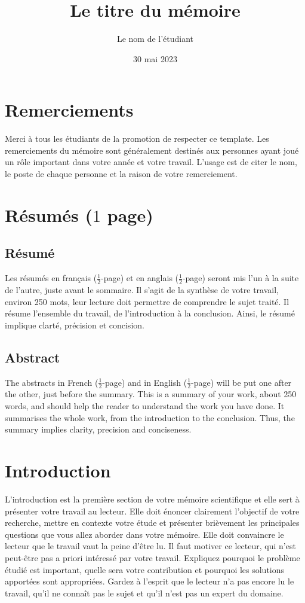 \documentclass[a4paper, 12pt, twoside]{report}
\author{Le nom de l'étudiant}
\title{Le titre du mémoire}
\date{30 mai 2023}
\begin{document}
\pagedegarde


\chapter*{Remerciements}
Merci à tous les étudiants de la promotion de respecter ce template. Les remerciements du mémoire sont généralement destinés aux personnes ayant joué un rôle important dans votre année et votre travail. L'usage est de citer le nom, le poste de chaque personne et la raison de votre remerciement.
\chapter*{Résumés ($1$ page)}
\section*{Résumé}
Les résumés en français ($\frac{1}{2}$-page) et en anglais ($\frac{1}{2}$-page) seront mis l’un à la suite de l’autre, juste avant le sommaire. Il s’agit de la synthèse de votre travail, environ 250 mots, leur lecture doit permettre de comprendre
le sujet traité. Il résume l'ensemble du travail, de l'introduction à la conclusion. Ainsi, le résumé implique clarté, précision et concision. 
\section*{Abstract}
The abstracts in French ($\frac{1}{2}$-page) and in English ($\frac{1}{2}$-page) will be put one after the other, just before the summary. This is a summary of your work, about 250 words, and should help the reader to understand the work you have done. It summarises the whole work, from the introduction to the conclusion. Thus, the summary implies clarity, precision and conciseness. 
\tableofcontents

\chapter{Introduction}
L'introduction est la première section de votre mémoire scientifique et elle sert à présenter votre travail au lecteur. Elle doit énoncer clairement l'objectif de votre recherche, mettre en contexte votre étude et présenter brièvement les principales questions que vous allez aborder dans votre mémoire. Elle doit convaincre le lecteur que le travail vaut la peine d’être lu. Il faut motiver ce lecteur, qui n’est peut-être pas a priori intéressé par votre travail. Expliquez pourquoi le problème étudié est important, quelle sera votre contribution et pourquoi les solutions apportées sont appropriées. Gardez à l’esprit que le lecteur n’a pas encore lu le travail, qu’il ne connaît pas le sujet et qu’il n’est pas un expert du domaine.
\end{document}
